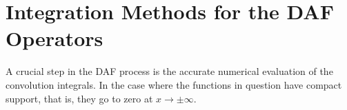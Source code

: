 \section{Integration Methods for the DAF Operators}

A crucial step in the DAF process is the accurate numerical evaluation of the
convolution integrals. In the case where the functions in question have 
compact support, that is, they go to zero at $x\to\pm\infty$. 




